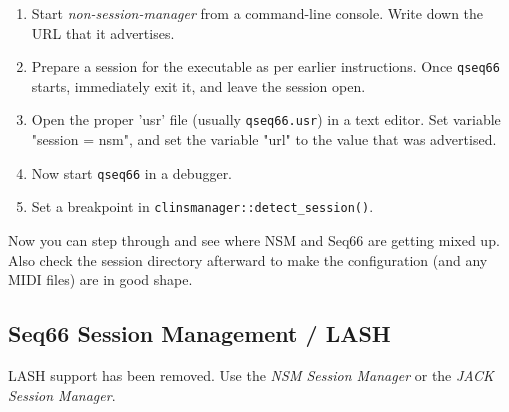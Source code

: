   \begin{enumerate}
      \item Start \textsl{non-session-manager} from a command-line console.
         Write down the URL that it advertises.
      \item Prepare a session for the executable as per earlier instructions.
         Once \texttt{qseq66} starts, immediately exit it, and leave the session
         open.
      \item Open the proper 'usr' file (usually \texttt{qseq66.usr}) in a 
         text editor.  Set variable "session = nsm", and set the variable "url"
         to the value that was advertised.
      \item Now start \texttt{qseq66} in a debugger.
      \item Set a breakpoint in \texttt{clinsmanager::detect\_session()}.
   \end{enumerate}
   
   Now you can step through and see where NSM and Seq66 are getting mixed up.
   Also check the session directory afterward to make the configuration
   (and any MIDI files) are in good shape.

\subsection{Seq66 Session Management / LASH}
\label{subsec:sessions_lash}

   LASH support has been removed.  Use the \textsl{NSM Session Manager} or
   the \textsl{JACK Session Manager}.

